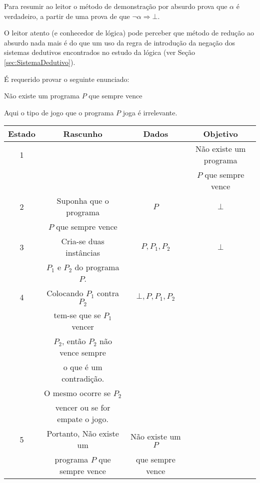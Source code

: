 \begin{rema}
	Para resumir ao leitor o método de demonstração por absurdo prova que $\alpha$ é verdadeiro, a partir de uma prova de que $\neg \alpha \Rightarrow \bot$.
\end{rema}

O leitor atento (e conhecedor de lógica) pode perceber que método de redução ao absurdo nada mais é do que um uso da regra de introdução da negação dos sistemas dedutivos encontrados no estudo da lógica  (ver Seção  \ref{sec:SistemaDedutivo}).

\begin{exem}\label{exe:ProvaAbsurdo1}
	É requerido provar o seguinte enunciado:
	\begin{center}
		Não existe um programa $P$ que sempre vence
	\end{center}
	Aqui o tipo de jogo que o programa $P$ joga é irrelevante.
	\begin{table*}[h]
		\centering
		\begin{tabular}{c|c|c|c}
			\hline
			\rowcolor{cinzaClaro}
			Estado & Rascunho & Dados & Objetivo\\
			\hline
			1 & & & Não existe um programa \\
			& & &$P$ que sempre vence\\ 
			2 & Suponha que o programa & $P$ & $\bot$\\
			& $P$ que  sempre vence &  & \\
			3 & Cria-se duas instâncias & $P, P_1, P_2$ & $\bot$\\
			& $P_1$ e $P_2$ do programa $P$. & & \\
			4 & Colocando $P_1$ contra $P_2$ & $\bot, P, P_1, P_2$ & \\
			& tem-se que se $P_1$ vencer & & \\
			& $P_2$, então $P_2$ não vence sempre & &\\
			& o que é um contradição. & & \\
			& O mesmo ocorre se $P_2$ & & \\
			& vencer ou se for empate o jogo. & & \\
			5 & Portanto, Não existe um & Não existe um $P$ &\\
			& programa $P$ que sempre vence & que sempre vence  &\\
			\hline
		\end{tabular}
	\end{table*}


\end{exem}
